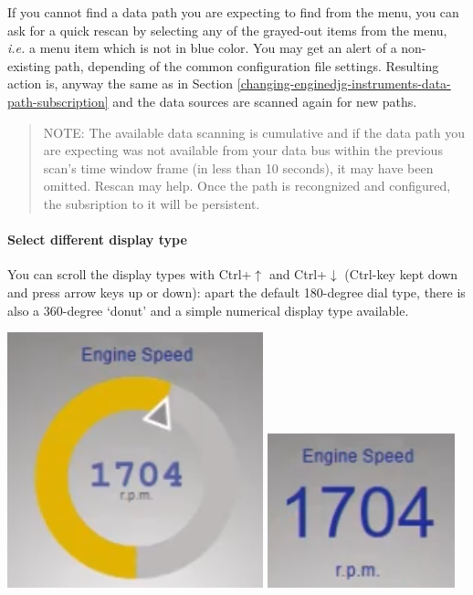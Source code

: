 \documentclass[11pt]{article}
\begin{document}
    If you cannot find a data path you are expecting to find from the menu,
you can ask for a quick rescan by selecting any of the grayed-out items
from the menu, \emph{i.e.} a menu item which is not in blue color. You
may get an alert of a non-existing path, depending of the common
configuration file settings. Resulting action is, anyway the same as in
Section \ref{changing-enginedjg-instruments-data-path-subscription} and
the data sources are scanned again for new paths.

    \begin{quote}
NOTE: The available data scanning is cumulative and if the data path you
are expecting was not available from your data bus within the previous
scan's time window frame (in less than 10 seconds), it may have been
omitted. Rescan may help. Once the path is recongnized and configured,
the subsription to it will be persistent.
\end{quote}

    \hypertarget{select-different-display-type}{%
\paragraph{Select different display
type}\label{select-different-display-type}}

    You can scroll the display types with Ctrl+\(\uparrow\) and
Ctrl+\(\downarrow\) (Ctrl-key kept down and press arrow keys up or
down): apart the default 180-degree dial type, there is also a
360-degree `donut' and a simple numerical display type available.

    \includegraphics{2020-02-15_EngineDJG_display_donut.png} \textbar{}
\includegraphics{2020-02-15_EngineDJG_display_simple.png}
\end{document}
